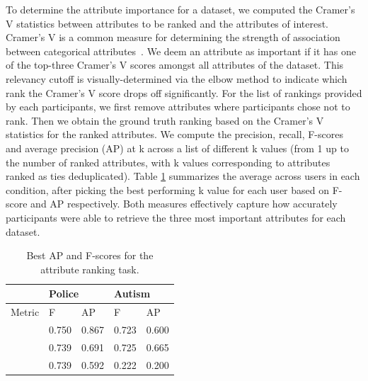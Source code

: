 To determine the attribute importance for a dataset, we computed the Cramer's V statistics between attributes to be ranked and the attributes of interest. Cramer's V is a common measure for determining the strength of association between categorical attributes~\cite{McHugh2013}. We deem an attribute as important if it has one of the top-three Cramer's V scores amongst all attributes of the dataset. This relevancy cutoff is visually-determined via the elbow method to indicate which rank the Cramer's V score drops off significantly. For the list of rankings provided by each participants, we first remove attributes where participants chose not to rank. Then we obtain the ground truth ranking based on the Cramer's V statistics for the ranked attributes. We compute the precision, recall, F-scores and average precision (AP) at k across a list of different k values (from 1 up to the number of ranked attributes, with k values corresponding to attributes ranked as ties deduplicated). Table \ref{table:ranking_results} summarizes the average across users in each condition, after picking the best performing k value for each user based on F-score and AP respectively. Both measures effectively capture how accurately participants were able to retrieve the three most important attributes for each dataset.
\begin{table}[ht!]
	\centering
	\begin{tabular}{|l|l|l|l|l|}
	\hline
	         & \multicolumn{2}{l|}{Police}                                   & \multicolumn{2}{l|}{Autism}                                   \\ \hline
	Metric   & F                             & AP                            & F                             & AP                            \\ \hline
	\system  & \cellcolor{blue!25}0.750 & \cellcolor{blue!25}0.867 & 0.723                         & 0.600                         \\ \hline
	\cluster & 0.739                         & 0.691                         & \cellcolor{blue!25}0.725 & \cellcolor{blue!25}0.665 \\ \hline
	\BFS     & 0.739                         & 0.592                         & 0.222                         & 0.200                         \\ \hline
	\end{tabular}
	\caption{Best AP and F-scores for the attribute ranking task.}
	\vspace{-10pt}
    \label{table:ranking_results}
\end{table}
